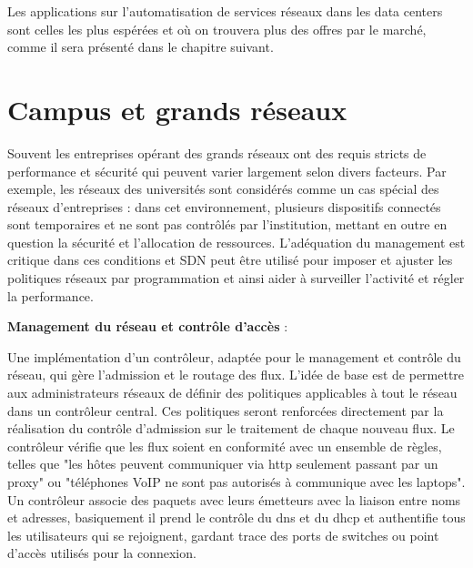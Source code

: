 Les applications sur l'automatisation de services réseaux dans les data centers sont celles les plus espérées et où on trouvera plus des offres par le marché, comme il sera présenté dans le chapitre suivant.


\section{Campus et grands réseaux}

Souvent les entreprises opérant des grands réseaux ont des requis stricts de performance et sécurité qui peuvent varier largement selon divers facteurs. Par exemple, les réseaux des universités sont considérés comme un cas spécial des réseaux d'entreprises : dans cet environnement, plusieurs dispositifs connectés sont temporaires et ne sont pas contrôlés par l'institution, mettant en outre en question la sécurité et l'allocation de ressources. L'adéquation du management est critique dans ces conditions et SDN peut être utilisé pour imposer et ajuster les politiques réseaux par programmation et ainsi aider à surveiller l'activité et régler la performance.


\textbf{Management du réseau et contrôle d'accès} : 

Une implémentation d'un contrôleur, adaptée pour le management et contrôle du réseau, qui gère l'admission et le routage des flux. L'idée de base est de permettre aux administrateurs réseaux de définir des politiques applicables à tout le réseau dans un contrôleur central. Ces politiques seront renforcées directement par la réalisation du contrôle d'admission sur le traitement de chaque nouveau flux. Le contrôleur vérifie que les flux soient en conformité avec un ensemble de règles, telles que "les hôtes peuvent communiquer via \gls{http} seulement passant par un proxy" ou "téléphones VoIP ne sont pas autorisés à communique avec les laptops". Un contrôleur associe des paquets avec leurs émetteurs avec la liaison entre noms et adresses, basiquement il prend le contrôle du \gls{dns} et du \gls{dhcp} et authentifie tous les utilisateurs qui se rejoignent, gardant trace des ports de switches ou point d'accès utilisés pour la connexion.

